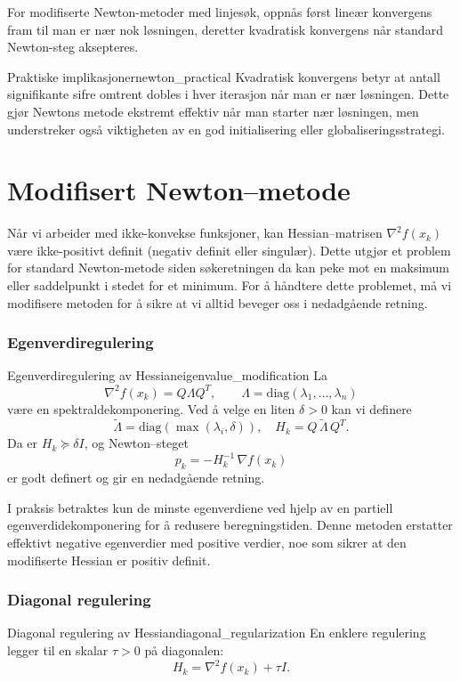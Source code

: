For modifiserte Newton-metoder med linjesøk, oppnås først lineær konvergens fram til man er nær nok løsningen, deretter kvadratisk konvergens når standard Newton-steg aksepteres.

\begin{remark}{Praktiske implikasjoner}{newton_practical}
	Kvadratisk konvergens betyr at antall signifikante sifre omtrent dobles i hver iterasjon når man er nær løsningen. Dette gjør Newtons metode ekstremt effektiv når man starter nær løsningen, men understreker også viktigheten av en god initialisering eller globaliseringsstrategi.
\end{remark}

\section{Modifisert Newton--metode}
Når vi arbeider med ikke-konvekse funksjoner, kan Hessian--matrisen $\nabla^2 f(x_k)$ være ikke-positivt definit (negativ definit eller singulær). Dette utgjør et problem for standard Newton-metode siden søkeretningen da kan peke mot en maksimum eller saddelpunkt i stedet for et minimum. For å håndtere dette problemet, må vi modifisere metoden for å sikre at vi alltid beveger oss i nedadgående retning.

\subsubsection{Egenverdiregulering}
\begin{definition}{Egenverdiregulering av Hessian}{eigenvalue_modification}
	La
	\[
		\nabla^2 f(x_k) = Q \Lambda Q^T,\qquad \Lambda = \mathrm{diag}(\lambda_1,\dots,\lambda_n)
	\]
	være en spektraldekomponering. Ved å velge en liten $\delta>0$ kan vi definere
	\[
		\tilde\Lambda = \mathrm{diag}(\max(\lambda_i,\delta)),\quad
		H_k = Q\,\tilde\Lambda\,Q^T.
	\]
	Da er $H_k\succeq\delta I$, og Newton--steget
	\[
		p_k = -H_k^{-1}\,\nabla f(x_k)
	\]
	er godt definert og gir en nedadgående retning.
\end{definition}

I praksis betraktes kun de minste egenverdiene ved hjelp av en partiell egenverdidekomponering for å redusere beregningstiden. Denne metoden erstatter effektivt negative egenverdier med positive verdier, noe som sikrer at den modifiserte Hessian er positiv definit.

\subsubsection{Diagonal regulering}
\begin{definition}{Diagonal regulering av Hessian}{diagonal_regularization}
	En enklere regulering legger til en skalar $\tau>0$ på diagonalen:
	\[
		H_k = \nabla^2 f(x_k) + \tau I.
	\]
\end{definition}

